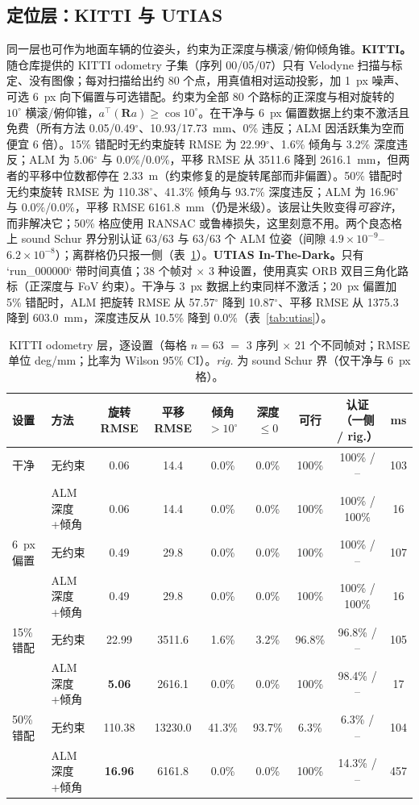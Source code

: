 \subsection{定位层：KITTI 与 UTIAS}\label{sec:local}
同一层也可作为地面车辆的位姿头，约束为正深度与横滚/俯仰倾角锥。\textbf{KITTI。}随仓库提供的 KITTI odometry 子集（序列 00/05/07）只有 Velodyne 扫描与标定、没有图像；每对扫描给出约 80 个点，用真值相对运动投影，加 1~px 噪声、可选 6~px 向下偏置与可选错配。约束为全部 80 个路标的正深度与相对旋转的 $10^\circ$ 横滚/俯仰锥，$a^\top(\mathbf R a)\ge\cos10^\circ$。在干净与 6~px 偏置数据上约束不激活且免费（所有方法 0.05/0.49$^\circ$、10.93/17.73~mm、0\% 违反；ALM 因活跃集为空而便宜 6 倍）。15\% 错配时无约束旋转 RMSE 为 22.99$^\circ$、1.6\% 倾角与 3.2\% 深度违反；ALM 为 5.06$^\circ$ 与 0.0\%/0.0\%，平移 RMSE 从 3511.6 降到 2616.1~mm，但两者的平移中位数都停在 2.33~m（约束修复的是旋转尾部而非偏置）。50\% 错配时无约束旋转 RMSE 为 110.38$^\circ$、41.3\% 倾角与 93.7\% 深度违反；ALM 为 16.96$^\circ$ 与 0.0\%/0.0\%，平移 RMSE 6161.8~mm（仍是米级）。该层让失败变得\emph{可容许}，而非解决它；50\% 格应使用 RANSAC 或鲁棒损失，这里刻意不用。两个良态格上 sound Schur 界分别认证 63/63 与 63/63 个 ALM 位姿（间隙 $4.9\times10^{-9}$--$6.2\times10^{-8}$）；离群格仍只报一侧（表~\ref{tab:kitti}）。\textbf{UTIAS In-The-Dark。}只有 `run\_000000` 带时间真值；38 个帧对 $\times$ 3 种设置，使用真实 ORB 双目三角化路标（正深度与 FoV 约束）。干净与 3~px 数据上约束同样不激活；20~px 偏置加 5\% 错配时，ALM 把旋转 RMSE 从 57.57$^\circ$ 降到 10.87$^\circ$、平移 RMSE 从 1375.3 降到 603.0~mm，深度违反从 10.5\% 降到 0.0\%（表~\ref{tab:utias}）。

\begin{table}[t]
\centering
\caption{KITTI odometry 层，逐设置（每格 $n=63$ $=$ 3 序列 $\times$ 21 个不同帧对；RMSE 单位 deg/mm；比率为 Wilson 95\% CI）。\emph{rig.} 为 sound Schur 界（仅干净与 6~px 格）。}
\label{tab:kitti}
\scriptsize
\setlength{\tabcolsep}{3pt}
\begin{tabular}{@{}llccccccc@{}}
\toprule
设置 & 方法 & 旋转 RMSE & 平移 RMSE & 倾角 $>10^\circ$ & 深度 $\le0$ & 可行 & 认证（一侧 / rig.） & ms \\
\midrule
干净 & 无约束 & 0.06 & 14.4 & 0.0\% & 0.0\% & 100\% & 100\% / -- & 103 \\
 & ALM 深度+倾角 & 0.06 & 14.4 & 0.0\% & 0.0\% & 100\% & 100\% / 100\% & 16 \\
6~px 偏置 & 无约束 & 0.49 & 29.8 & 0.0\% & 0.0\% & 100\% & 100\% / -- & 107 \\
 & ALM 深度+倾角 & 0.49 & 29.8 & 0.0\% & 0.0\% & 100\% & 100\% / 100\% & 16 \\
15\% 错配 & 无约束 & 22.99 & 3511.6 & 1.6\% & 3.2\% & 96.8\% & 96.8\% / -- & 105 \\
 & ALM 深度+倾角 & \textbf{5.06} & 2616.1 & 0.0\% & 0.0\% & 100\% & 98.4\% / -- & 17 \\
50\% 错配 & 无约束 & 110.38 & 13230.0 & 41.3\% & 93.7\% & 6.3\% & 6.3\% / -- & 104 \\
 & ALM 深度+倾角 & \textbf{16.96} & 6161.8 & 0.0\% & 0.0\% & 100\% & 14.3\% / -- & 457 \\
\bottomrule
\end{tabular}
\end{table}

